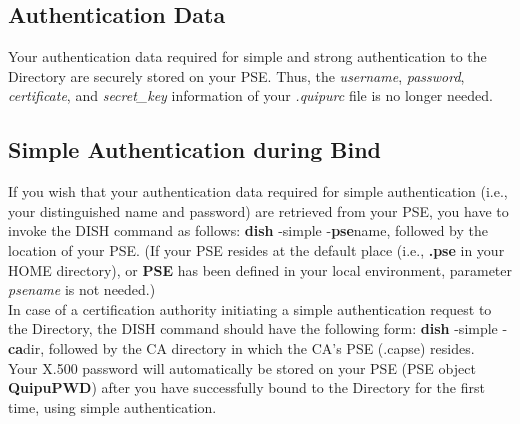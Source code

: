 \subsection{Authentication Data}
Your authentication data required for simple and strong authentication to the
Directory are securely stored on your PSE. Thus, the {\em username}, {\em password}, {\em certificate}, 
and {\em secret\_key} information of your {\em .quipurc} file is no longer needed.


\subsection{Simple Authentication during Bind}
If you wish that your authentication data required for simple authentication (i.e.,
your distinguished name and password) are retrieved from your PSE, you have to invoke the
DISH command as follows:
\bvtab
\1 {\bf dish} -simple -{\bf pse}name,
\evtab
followed by the location of your PSE. (If your PSE resides
at the default place (i.e., {\bf .pse} in your HOME directory), or {\bf PSE} has been 
defined in your local environment, parameter {\em psename} is not needed.)
\\ [1em]
In case of a certification authority initiating a simple authentication request
to the Directory, the DISH command should have the following form:
\bvtab
\1 {\bf dish} -simple -{\bf ca}dir,
\evtab
followed by the CA directory in which the CA's PSE (.capse) resides.
\\ [1em]
Your X.500 password will automatically be stored on your PSE (PSE object {\bf QuipuPWD})
after you have successfully bound to the Directory for the first time, using simple
authentication.


